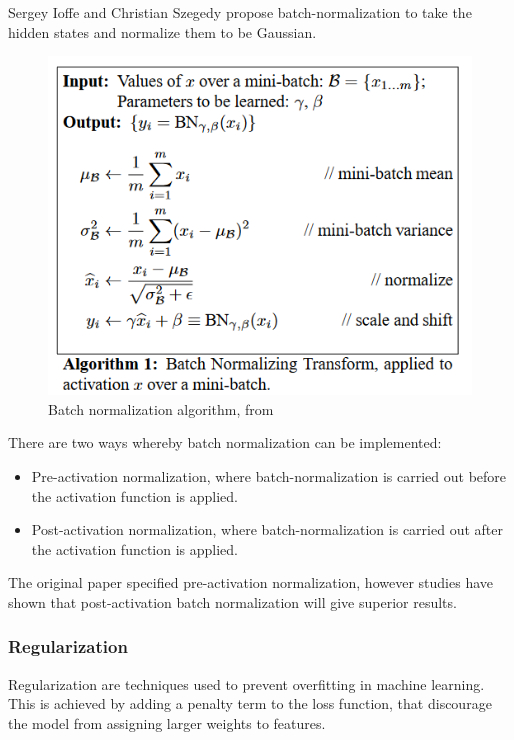 		Sergey Ioffe and Christian Szegedy propose batch-normalization \cite{ioffe2015batch} to take the hidden states and normalize them to be Gaussian.
		
		\begin{figure}[H]
			\centering
			\includegraphics[width=0.7\linewidth]{img/img-ioffeBatchNormalizationAccelerating2015-1}
			\caption{Batch normalization algorithm, from \cite{ioffe2015batch}}
			\label{fig:img-ioffebatchnormalizationaccelerating2015-1}
		\end{figure}
		

		
		There are two ways whereby batch normalization can be implemented:
		
		\begin{itemize}
			\item Pre-activation normalization, where batch-normalization is carried out before the activation function is applied.
			\item Post-activation normalization, where batch-normalization is carried out after the activation function is applied.
		\end{itemize}
		\bigskip
		
		The original paper specified pre-activation normalization, however studies have shown that post-activation batch normalization will give superior results.



		\bigskip
		\subsubsection{Regularization}
		
		Regularization are techniques used to prevent overfitting in machine learning. This is achieved by adding a penalty term to the loss function, that discourage the model from assigning larger weights to features.
		
